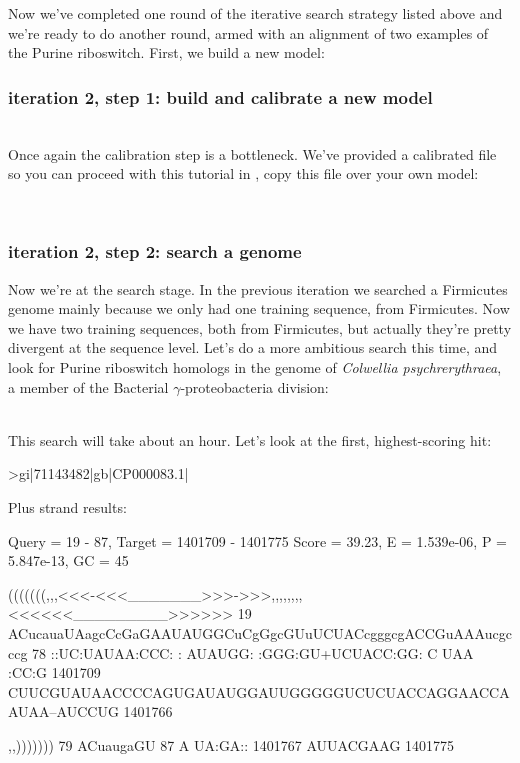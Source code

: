 
Now we've completed one round of the iterative search strategy listed
above and we're ready to do another round, armed with an alignment of
two examples of the Purine riboswitch. First, we build a new model:

\subsubsection{iteration 2, step 1: build and calibrate a new model}
\\

Once again the calibration step is a bottleneck. We've provided a
calibrated file so you can proceed with this tutorial in
, copy this file over your own model:

\\

\subsubsection{iteration 2, step 2: search a genome}

Now we're at the search stage. In the previous iteration we searched a
Firmicutes genome mainly because we only had one training sequence, from
Firmicutes. Now we have two training sequences, both from Firmicutes,
but actually they're pretty divergent at the sequence level. Let's do a
more ambitious search this time, and look for Purine riboswitch
homologs in the genome of \emph{Colwellia psychrerythraea}, a member of the
Bacterial $\gamma$-proteobacteria division:

\\

This search will take about an hour. Let's look at the first,
highest-scoring hit:

{\samepage
\begin{sreoutput}
>gi|71143482|gb|CP000083.1|

  Plus strand results:

 Query = 19 - 87, Target = 1401709 - 1401775
 Score = 39.23, E = 1.539e-06, P = 5.847e-13, GC =  45

           (((((((,,,<<<-<<<_______>>>->>>,,,,,,,,<<<<<<_________>>>>>>
        19 ACucauaUAagcCcGaGAAUAUGGCuCgGgcGUuUCUACcgggcgACCGuAAAucgcccg 78      
           ::UC:UAUAA:CCC: : AUAUGG: :GGG:GU+UCUACC:GG:  C  UAA   :CC:G
   1401709 CUUCGUAUAACCCCAGUGAUAUGGAUUGGGGGUCUCUACCAGGAACCAAUAA--AUCCUG 1401766 

           ,,)))))))
        79 ACuaugaGU 87      
           A UA:GA::
   1401767 AUUACGAAG 1401775 
\end{sreoutput}
}

